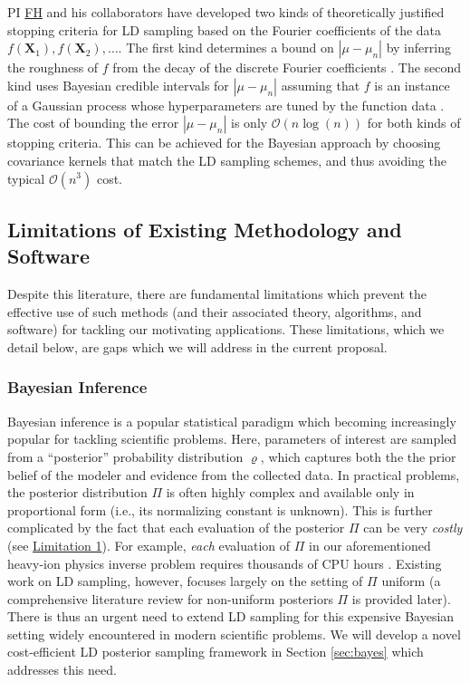 \documentclass[11pt]{NSFamsart}
\newcommand{\FH}{\hyperlink{FHlink}{FH}\xspace}
\newcommand{\Limone}{\hyperlink{Lim1link}{Limitation 1}\xspace}
\newcommand{\bX}{{\boldsymbol{X}}}
\def\abs#1{\ensuremath{\left \lvert #1 \right \rvert}}
\newcommand{\Order}{\mathcal{O}}
\begin{document}
PI \FH and his collaborators have developed two kinds of theoretically justified stopping criteria for LD sampling based on the Fourier coefficients of the data $f(\bX_1), f(\bX_2), \ldots$.  The first kind determines a bound on $\abs{\mu-\mu_n}$ by inferring the roughness of $f$ from the decay of the discrete Fourier coefficients \cite{HicJim16a,JimHic16a,HicEtal17a}.  The second kind uses  Bayesian credible intervals for $\abs{\mu-\mu_n}$ assuming that $f$ is an instance of a Gaussian process whose hyperparameters are tuned by the function data \cite{HicJag18b,RatHic19a,JagHic22a}. The cost of bounding the error $\abs{\mu-\mu_n}$ is only $\Order(n \log(n))$ for both kinds of stopping criteria.  This can be achieved for the Bayesian approach by choosing covariance kernels that match the LD sampling schemes, and thus avoiding the typical $\Order(n^3)$ cost.


\subsection{Limitations of Existing Methodology and Software} \label{sec:limit}

Despite this literature, there are fundamental limitations which prevent the effective use of such methods (and their associated theory, algorithms, and software) for tackling our motivating applications. These limitations, which we detail below, are gaps which we will address in the current proposal.

\subsubsection{Bayesian Inference} Bayesian inference \citep{gelman1995bayesian} is a popular statistical paradigm which becoming increasingly popular for tackling scientific problems. Here, parameters of interest are sampled from a ``posterior'' probability distribution $\varrho$, which captures both the the prior belief of the modeler and evidence from the collected data. In practical problems, the posterior distribution $\Pi$ is often highly complex and available only in proportional form (i.e., its normalizing constant is unknown). This is further complicated by the fact that each evaluation of the posterior $\Pi$ can be very \textit{costly} (see \Limone). For example, \textit{each} evaluation of $\Pi$ in our aforementioned heavy-ion physics inverse problem requires thousands of CPU hours \cite{everett2021multisystem}. Existing work on LD sampling, however, focuses largely on the setting of $\Pi$ uniform (a comprehensive literature review for non-uniform posteriors $\Pi$ is provided later). There is thus an urgent need to extend LD sampling for this expensive Bayesian setting widely encountered in modern scientific problems. We will develop a novel cost-efficient LD posterior sampling framework in Section \ref{sec:bayes} which addresses this need.
\end{document}
